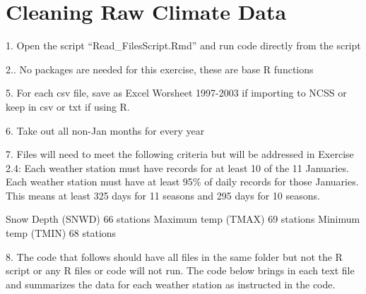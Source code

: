 \documentclass[
  letterpaper,
]{book}
\begin{document}
\hypertarget{cleaning-raw-climate-data}{%
\section{Cleaning Raw Climate Data}\label{cleaning-raw-climate-data}}

1. Open the script ``Read\_FilesScript.Rmd'' and run code directly from
the script

2.. No packages are needed for this exercise, these are base R functions

5. For each csv file, save as Excel Worsheet 1997-2003 if importing to
NCSS or keep in csv or txt if using R.

6. Take out all non-Jan months for every year

7. Files will need to meet the following criteria but will be addressed
in Exercise 2.4: Each weather station must have records for at least 10
of the 11 Januaries. Each weather station must have at least 95\% of
daily records for those Januaries. This means at least 325 days for 11
seasons and 295 days for 10 seasons.

Snow Depth (SNWD) 66 stations Maximum temp (TMAX) 69 stations Minimum
temp (TMIN) 68 stations

8. The code that follows should have all files in the same folder but
not the R script or any R files or code will not run. The code below
brings in each text file and summarizes the data for each weather
station as instructed in the code.
\end{document}
